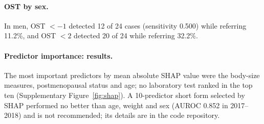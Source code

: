 \documentclass[11pt,a4paper]{article}
\begin{document}
\paragraph{OST by sex.} In men, OST $<-1$ detected 12 of 24 cases (sensitivity 0.500) while referring 11.2\%, and OST $<2$ detected 20 of 24 while referring 32.2\%.

\paragraph{Predictor importance: results.} The most important predictors by mean absolute SHAP value were the body-size measures, postmenopausal status and age; no laboratory test ranked in the top ten (Supplementary Figure~\ref{fig:shap}). A 10-predictor short form selected by SHAP performed no better than age, weight and sex (AUROC 0.852 in 2017--2018) and is not recommended; its details are in the code repository.
\end{document}
